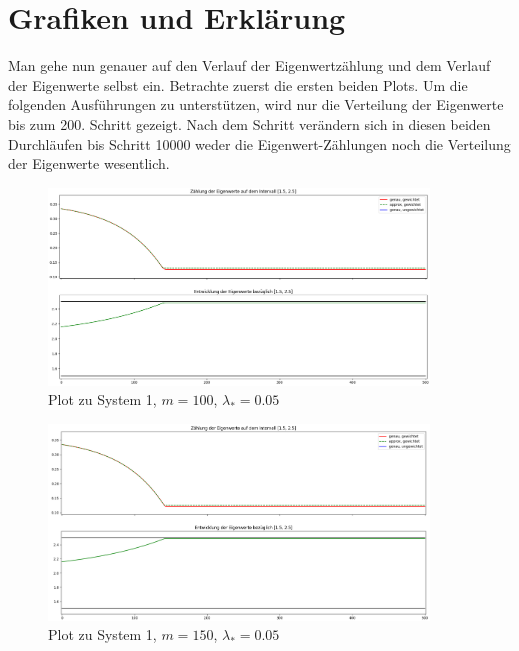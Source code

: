 \documentclass[a4paper,12pt]{report}
\newcommand{\1}{\mathds{1}}
\theoremstyle{plain} %
\theoremstyle{definition} %
\theoremstyle{remark}
\begin{document}
      \section{Grafiken und Erklärung}
            Man gehe nun genauer auf den Verlauf der Eigenwertzählung und dem Verlauf der Eigenwerte selbst ein.
            Betrachte zuerst die ersten beiden Plots.
            Um die folgenden Ausführungen zu unterstützen, wird nur die Verteilung der Eigenwerte bis zum 200. Schritt gezeigt.
            Nach dem Schritt verändern sich in diesen beiden Durchläufen bis Schritt 10000 weder die Eigenwert-Zählungen noch die Verteilung der Eigenwerte wesentlich.
            \begin{figure}[h!t]
                  \centering
                  \includegraphics[width=0.9\textwidth, keepaspectratio]{./Original/Plot_1_100_0.05.png}
                  \caption{Plot zu System 1, $m=100$, $\lambda_*=0.05$}
                  \label{fig: Plot_1_100_0.05}
            \end{figure}

            \begin{figure}[h!t]
                  \centering
                  \includegraphics[width=0.9\textwidth, keepaspectratio]{./Original/Plot_1_150_0.05.png}
                  \caption{Plot zu System 1, $m=150$, $\lambda_*=0.05$}
                  \label{fig: Plot_1_150_0.05}
            \end{figure}
\end{document}
